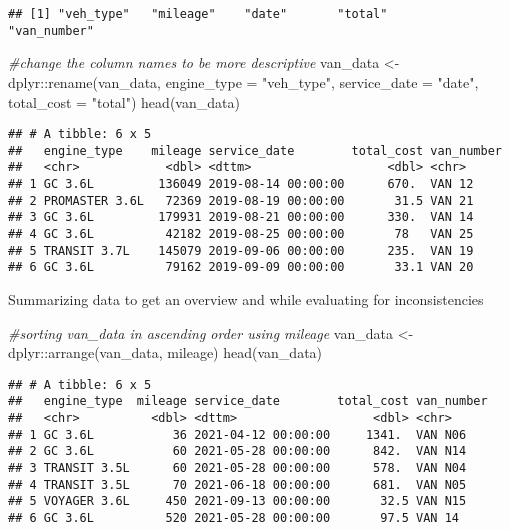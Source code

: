 \documentclass[
]{article}
\newenvironment{Shaded}{\begin{snugshade}}{\end{snugshade}}
\newcommand{\AttributeTok}[1]{\textcolor[rgb]{0.77,0.63,0.00}{#1}}
\newcommand{\CommentTok}[1]{\textcolor[rgb]{0.56,0.35,0.01}{\textit{#1}}}
\newcommand{\FunctionTok}[1]{\textcolor[rgb]{0.00,0.00,0.00}{#1}}
\newcommand{\NormalTok}[1]{#1}
\newcommand{\OtherTok}[1]{\textcolor[rgb]{0.56,0.35,0.01}{#1}}
\newcommand{\SpecialCharTok}[1]{\textcolor[rgb]{0.00,0.00,0.00}{#1}}
\newcommand{\StringTok}[1]{\textcolor[rgb]{0.31,0.60,0.02}{#1}}
\begin{document}
\begin{verbatim}
## [1] "veh_type"   "mileage"    "date"       "total"      "van_number"
\end{verbatim}

\begin{Shaded}
\begin{Highlighting}[]
\CommentTok{\#change the column names to be more descriptive}
\NormalTok{van\_data }\OtherTok{\textless{}{-}}\NormalTok{ dplyr}\SpecialCharTok{::}\FunctionTok{rename}\NormalTok{(van\_data, }\AttributeTok{engine\_type =} \StringTok{"veh\_type"}\NormalTok{, }\AttributeTok{service\_date =} \StringTok{"date"}\NormalTok{, }\AttributeTok{total\_cost =} \StringTok{"total"}\NormalTok{)}
\FunctionTok{head}\NormalTok{(van\_data)}
\end{Highlighting}
\end{Shaded}

\begin{verbatim}
## # A tibble: 6 x 5
##   engine_type    mileage service_date        total_cost van_number
##   <chr>            <dbl> <dttm>                   <dbl> <chr>     
## 1 GC 3.6L         136049 2019-08-14 00:00:00      670.  VAN 12    
## 2 PROMASTER 3.6L   72369 2019-08-19 00:00:00       31.5 VAN 21    
## 3 GC 3.6L         179931 2019-08-21 00:00:00      330.  VAN 14    
## 4 GC 3.6L          42182 2019-08-25 00:00:00       78   VAN 25    
## 5 TRANSIT 3.7L    145079 2019-09-06 00:00:00      235.  VAN 19    
## 6 GC 3.6L          79162 2019-09-09 00:00:00       33.1 VAN 20
\end{verbatim}

Summarizing data to get an overview and while evaluating for
inconsistencies

\begin{Shaded}
\begin{Highlighting}[]
\CommentTok{\#sorting van\_data in ascending order using mileage}
\NormalTok{van\_data }\OtherTok{\textless{}{-}}\NormalTok{ dplyr}\SpecialCharTok{::}\FunctionTok{arrange}\NormalTok{(van\_data, mileage)}
\FunctionTok{head}\NormalTok{(van\_data)}
\end{Highlighting}
\end{Shaded}

\begin{verbatim}
## # A tibble: 6 x 5
##   engine_type  mileage service_date        total_cost van_number
##   <chr>          <dbl> <dttm>                   <dbl> <chr>     
## 1 GC 3.6L           36 2021-04-12 00:00:00     1341.  VAN N06   
## 2 GC 3.6L           60 2021-05-28 00:00:00      842.  VAN N14   
## 3 TRANSIT 3.5L      60 2021-05-28 00:00:00      578.  VAN N04   
## 4 TRANSIT 3.5L      70 2021-06-18 00:00:00      681.  VAN N05   
## 5 VOYAGER 3.6L     450 2021-09-13 00:00:00       32.5 VAN N15   
## 6 GC 3.6L          520 2021-05-28 00:00:00       97.5 VAN 14
\end{verbatim}
\end{document}
